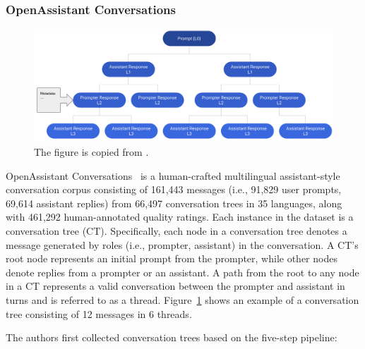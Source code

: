 \documentclass[11pt]{article}
\begin{document}
\subsubsection{OpenAssistant Conversations}
\begin{figure}[t]
  \centering
  \begin{minipage}[t]{0.5\textwidth}
    \centering
    \includegraphics[width=1\textwidth]{figures/openassistant_fig1.jpg}
  \end{minipage}%
  \caption{The figure is copied from \citet{kopf2023openassistant}.}
  \label{fig:data_openassistant}
\end{figure}

OpenAssistant Conversations~\citep{kopf2023openassistant} is a human-crafted multilingual assistant-style conversation corpus consisting of 
161,443 messages (i.e., 91,829 user prompts, 69,614 assistant replies) from 66,497 conversation trees in 35 languages, along with 461,292 human-annotated quality ratings. Each instance in the dataset is a conversation tree (CT). Specifically, each node in a conversation tree denotes a message generated by roles (i.e., prompter, assistant) in the conversation. A CT's root node represents an initial prompt from the prompter, while other nodes denote replies from a prompter or an assistant. 
A path from the root to any node in a CT represents a valid conversation between the prompter and assistant in turns and is referred to as a thread. Figure~\ref{fig:data_openassistant} shows an example of a conversation tree consisting of 12 messages in 6 threads. 

The authors first collected conversation trees based on the five-step pipeline: 
\end{document}
